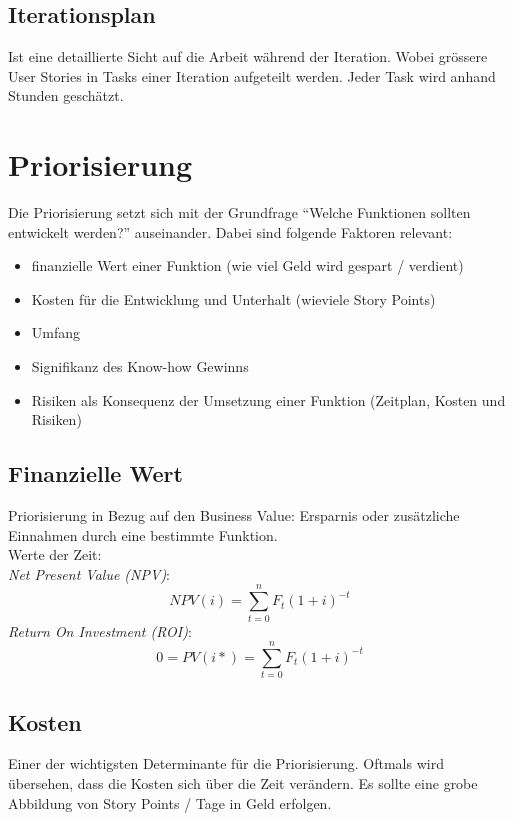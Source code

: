 \documentclass{report}
\theoremstyle{definition}
\theoremstyle{example}
\begin{document}
\subsection{Iterationsplan}
Ist eine detaillierte Sicht auf die Arbeit während der Iteration. Wobei grössere User Stories in Tasks einer Iteration aufgeteilt werden. Jeder Task wird anhand Stunden geschätzt.

\section{Priorisierung}
Die Priorisierung setzt sich mit der Grundfrage ``Welche Funktionen sollten entwickelt werden?'' auseinander. Dabei sind folgende Faktoren relevant:\\
\begin{itemize}
	\item finanzielle Wert einer Funktion (wie viel Geld wird gespart / verdient)
	\item Kosten für die Entwicklung und Unterhalt (wieviele Story Points)
	\item Umfang
	\item Signifikanz des Know-how Gewinns
	\item Risiken als Konsequenz der Umsetzung einer Funktion (Zeitplan, Kosten und Risiken)
\end{itemize}

\subsection{Finanzielle Wert}
Priorisierung in Bezug auf den Business Value: Ersparnis oder zusätzliche Einnahmen durch eine bestimmte Funktion.\\
Werte der Zeit:\\
\textit{Net Present Value (NPV)}:
\begin{equation}
NPV(i) = \sum\limits^n_{t=0} F_t (1+i)^{-t}
\end{equation}
\textit{Return On Investment (ROI)}:
\begin{equation}
	0 = PV(i*) = \sum\limits^n_{t=0} F_t (1+i)^{-t}
\end{equation}

\subsection{Kosten}
Einer der wichtigsten Determinante für die Priorisierung. Oftmals wird übersehen, dass die Kosten sich über die Zeit verändern. Es sollte eine grobe Abbildung von Story Points / Tage in Geld erfolgen.
\end{document}
